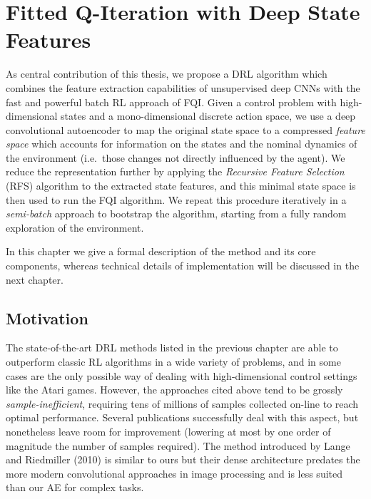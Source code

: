 \chapter{Fitted Q-Iteration with Deep State Features}
\label{chapter4_research_problem}
\thispagestyle{empty}

\vspace{0.5cm}

As central contribution of this thesis, we propose a DRL algorithm which 
combines the feature extraction capabilities of unsupervised deep CNNs with the 
fast and powerful batch RL approach of FQI. 
Given a control problem with high-dimensional states and a mono-dimensional 
discrete action space, we use a deep convolutional autoencoder to map the 
original state space to a compressed \textit{feature space} which accounts for 
information on the states and the nominal dynamics of the environment (i.e.\ 
those changes not directly influenced by the agent). 
We reduce the representation further by applying the \textit{Recursive Feature
Selection} (RFS) algorithm to the extracted state features, and this minimal 
state space is then used to run the FQI algorithm. 
We repeat this procedure iteratively in a \textit{semi-batch} approach to 
bootstrap the algorithm, starting from a fully random exploration of the 
environment.

In this chapter we give a formal description of the method and its core 
components, whereas technical details of implementation will be discussed in the 
next chapter.

\section{Motivation}
The state-of-the-art DRL methods listed in the previous chapter are able to 
outperform classic RL algorithms in a wide variety of problems, and in some 
cases are the only possible way of dealing with high-dimensional control 
settings like the Atari games. 
However, the approaches cited above tend to be grossly 
\textit{sample-inefficient}, requiring tens of millions of samples collected
on-line to reach optimal performance. Several publications successfully deal 
with this aspect, but nonetheless leave room for improvement (lowering at most
by one order of magnitude the number of samples required).
The method introduced by Lange and Riedmiller (2010) \cite{lange2010deep} is 
similar to ours but their dense architecture predates the more modern 
convolutional approaches in image processing and is less suited than our AE for 
complex tasks.

